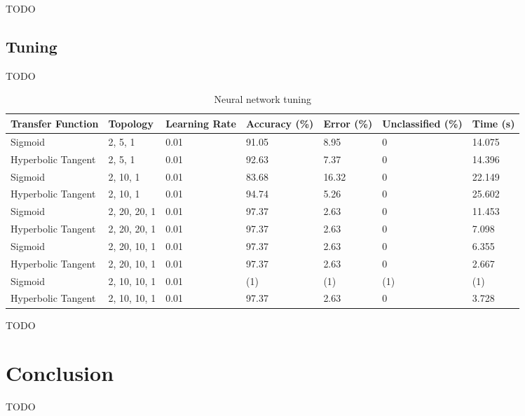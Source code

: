 \documentclass[a4paper]{article}
\begin{document}
TODO

\subsection{Tuning}

TODO

\begin{table}[h!]
  \centering
  \begin{tabular}{@{}lllllll@{}}
    \toprule
    Transfer Function  & Topology     & Learning Rate & Accuracy (\%) & Error (\%) & Unclassified (\%) & Time (s) \\
    \midrule
    Sigmoid            & 2, 5, 1      & 0.01          & 91.05         & 8.95       & 0                 & 14.075   \\
    Hyperbolic Tangent & 2, 5, 1      & 0.01          & 92.63         & 7.37       & 0                 & 14.396   \\
    Sigmoid            & 2, 10, 1     & 0.01          & 83.68         & 16.32      & 0                 & 22.149   \\
    Hyperbolic Tangent & 2, 10, 1     & 0.01          & 94.74         & 5.26       & 0                 & 25.602   \\
    Sigmoid            & 2, 20, 20, 1 & 0.01          & 97.37         & 2.63       & 0                 & 11.453   \\
    Hyperbolic Tangent & 2, 20, 20, 1 & 0.01          & 97.37         & 2.63       & 0                 & 7.098    \\
    Sigmoid            & 2, 20, 10, 1 & 0.01          & 97.37         & 2.63       & 0                 & 6.355    \\
    Hyperbolic Tangent & 2, 20, 10, 1 & 0.01          & 97.37         & 2.63       & 0                 & 2.667    \\
    Sigmoid            & 2, 10, 10, 1 & 0.01          & (1)           & (1)        & (1)               & (1)      \\
    Hyperbolic Tangent & 2, 10, 10, 1 & 0.01          & 97.37         & 2.63       & 0                 & 3.728    \\
    \bottomrule
  \end{tabular}
  \caption{Neural network tuning}
  \label{tab:nn_tuning}
\end{table}

TODO

\section{Conclusion}

TODO

\end{document}
